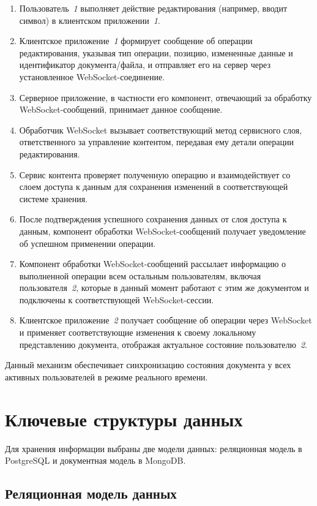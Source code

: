 \begin{enumerate}
    \item Пользователь~\textit{1} выполняет действие редактирования (например, вводит символ) в клиентском приложении~\textit{1}.
    \item Клиентское приложение~\textit{1} формирует сообщение об операции редактирования, указывая тип операции, позицию, измененные данные и идентификатор документа/файла, и отправляет его на сервер через установленное WebSocket-соединение.
    \item Серверное приложение, в частности его компонент, отвечающий за обработку WebSocket-сообщений, принимает данное сообщение.
    \item Обработчик WebSocket вызывает соответствующий метод сервисного слоя, ответственного за управление контентом, передавая ему детали операции редактирования.
    \item Сервис контента проверяет полученную операцию и взаимодействует со слоем доступа к данным для сохранения изменений в соответствующей системе хранения.
    \item После подтверждения успешного сохранения данных от слоя доступа к данным, компонент обработки WebSocket-сообщений получает уведомление об успешном применении операции.
    \item Компонент обработки WebSocket-сообщений рассылает информацию о выполненной операции всем остальным пользователям, включая пользователя~\textit{2}, которые в данный момент работают с этим же документом и подключены к соответствующей WebSocket-сессии.
    \item Клиентское приложение~\textit{2} получает сообщение об операции через WebSocket и применяет соответствующие изменения к своему локальному представлению документа, отображая актуальное состояние пользователю~\textit{2}.
\end{enumerate}

Данный механизм обеспечивает синхронизацию состояния документа у всех активных пользователей в режиме реального времени.

\section{Ключевые структуры данных}

Для хранения информации выбраны две модели данных: реляционная модель в PostgreSQL и документная модель в MongoDB.

\subsection{Реляционная модель данных}

